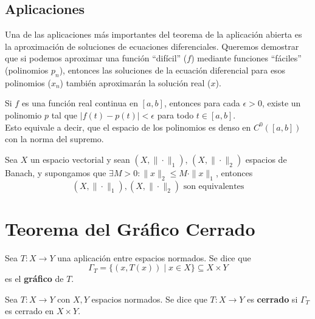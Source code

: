 \documentclass[12pt]{book}
\newcommand{\tbf}{\textbf}
\begin{document}
\subsection{Aplicaciones}
\noindent
Una de las aplicaciones más importantes del teorema de la aplicación abierta es la aproximación de soluciones de ecuaciones diferenciales. Queremos demostrar que si podemos aproximar una función ``difícil'' ($f$) mediante funciones ``fáciles'' (polinomios $p_n$), entonces las soluciones de la ecuación diferencial para esos polinomios ($x_n$) también aproximarán la solución real ($x$). \\ 


\begin{teo}
    Si $f$ es una función real continua en $[a, b]$, entonces para cada $\epsilon > 0$, existe un polinomio $p$ tal que $|f(t) - p(t)| < \epsilon$ para todo $t \in [a, b]$. \\
    \noindent
    Esto equivale a decir, que el espacio de los polinomios es denso en $C^0([a, b])$ con la norma del supremo.
\end{teo}

\begin{coro}\label{coro:equivalencia-normas}
    Sea $X$ un espacio vectorial y sean $(X, \|\cdot\|_1)$, $(X, \|\cdot\|_2)$ espacios de Banach, y supongamos que $\exists M > 0 : \|x\|_2 \leq M \cdot \|x\|_1$, entonces
    \begin{equation*}
        (X, \|\cdot\|_1), (X, \|\cdot\|_2) \text{ son equivalentes}
    \end{equation*}
\end{coro}

\section{Teorema del Gráfico Cerrado}

\begin{definicion}
    Sea $T: X \to Y$ una aplicación entre espacios normados. Se dice que 
    \begin{equation*}
        \Gamma_T = \{ (x, T(x)) \mid x \in X \} \subseteq X \times Y
    \end{equation*}
    es el \tbf{gráfico} de $T$. \\
\end{definicion}

\begin{definicion}
    Sea $T: X \to Y$ con $X, Y$ espacios normados. Se dice que $T: X \to Y$ es \textbf{cerrado} si $\Gamma_T$ es cerrado en $X \times Y$. \\
\end{definicion}
\end{document}

